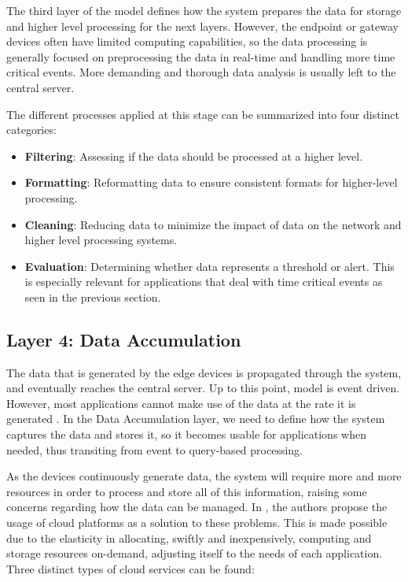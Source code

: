 The third layer of the model defines how the system prepares the data for storage and higher level processing for the next layers. However, the endpoint or gateway devices often have limited computing capabilities, so the data processing is generally focused on preprocessing the data in real-time and handling more time critical events. More demanding and thorough data analysis is usually left to the central server. \bigskip

The different processes applied at this stage can be summarized into four distinct categories:

\begin{itemize}
    \item \textbf{Filtering}: Assessing if the data should be processed at a higher level. 
    \item \textbf{Formatting}: Reformatting data to ensure consistent formats for higher-level processing.
    \item \textbf{Cleaning}: Reducing data to minimize the impact of data on the network and higher level processing systems.
    \item \textbf{Evaluation}: Determining whether data represents a threshold or alert. This is especially relevant for applications that deal with time critical events as seen in the previous section.
\end{itemize}


\subsection{Layer 4: Data Accumulation}
\label{sec:iot-model-layer4}

The data that is generated by the edge devices is propagated through the system, and eventually reaches the central server. Up to this point, model is event driven. However, most applications cannot make use of the data at the rate it is generated \cite{10.5555/3161403}. In the Data Accumulation layer, we need to define how the system captures the data and stores it, so it becomes usable for applications when needed, thus transiting from event to query-based processing. \bigskip

As the devices continuously generate data, the system will require more and more resources in order to process and store all of this information, raising some concerns regarding how the data can be managed. In \cite{Doukas2012}, the authors propose the usage of cloud platforms as a solution to these problems. This is made possible due to the elasticity in allocating, swiftly and inexpensively, computing and storage resources on-demand, adjusting itself to the needs of each application. Three distinct types of cloud services can be found: 


